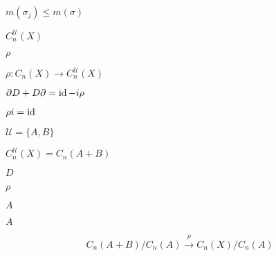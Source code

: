 \documentclass[10pt]{book}
\begin{document}
\begin{mdSnippets}
\begin{mdInlineSnippet}[5e4d2193f27963b5f6f9599bc4676aa5]
$m(\sigma_j) \le m(\sigma)$\end{mdInlineSnippet}%
\begin{mdInlineSnippet}%
$C_n^\mathcal{U}(X)$\end{mdInlineSnippet}%
\begin{mdInlineSnippet}[d2606be4e0cd2c9a6179c8f2e3547a85]%
$\rho$\end{mdInlineSnippet}%
\begin{mdInlineSnippet}[3714d0151ff63d8122bea863fb9950b8]%
$\rho: C_n(X) \to C_n^\mathcal{U}(X)$\end{mdInlineSnippet}%
\begin{mdInlineSnippet}%
$\partial D + D \partial = \operatorname{id} - i\rho$\end{mdInlineSnippet}%
\begin{mdInlineSnippet}[3ed0cb1a50f18ace2e3256d42535d3ff]%
$\rho i = \operatorname{id}$\end{mdInlineSnippet}%
\begin{mdInlineSnippet}[f0544c45761b7c131d0a91478e8dd59d]%
$\mathcal{U} = \{A, B\}$\end{mdInlineSnippet}%
\begin{mdInlineSnippet}[3ae988101fbe917d736d5724f68353d0]%
$C_n^\mathcal{U}(X) = C_n(A+B)$\end{mdInlineSnippet}%
\begin{mdInlineSnippet}[f623e75af30e62bbd73d6df5b50bb7b5]%
$D$\end{mdInlineSnippet}%
\begin{mdInlineSnippet}[d2606be4e0cd2c9a6179c8f2e3547a85]%
$\rho$\end{mdInlineSnippet}%
\begin{mdInlineSnippet}[7fc56270e7a70fa81a5935b72eacbe29]%
$A$\end{mdInlineSnippet}%
\begin{mdInlineSnippet}[7fc56270e7a70fa81a5935b72eacbe29]%
$A$\end{mdInlineSnippet}%
\begin{mdDisplaySnippet}[2b3bb20918660320ac288195deae4194]%
\[%
C_n(A+B) / C_n(A) \overset{\rho}{\longrightarrow} C_n(X) / C_n(A)
\]%
\end{mdDisplaySnippet}%

\end{mdSnippets}
\end{document}
